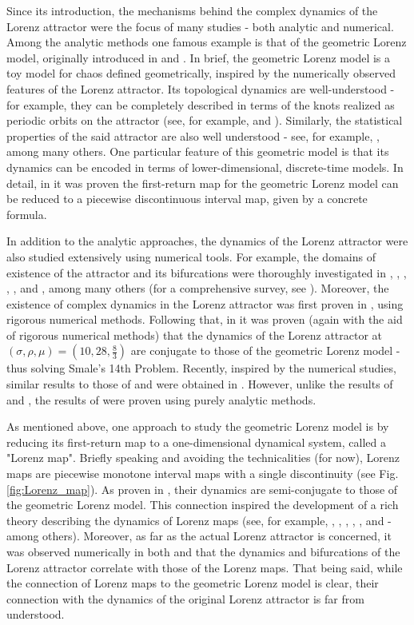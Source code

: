 \documentclass[10pt,reqno]{amsart}
\theoremstyle{plain}
\theoremstyle{assumption}
\theoremstyle{notation}
\theoremstyle{claim}
\theoremstyle{conj}
\theoremstyle{theorem}
\theoremstyle{proposition}
\theoremstyle{corollary}
\begin{document}
Since its introduction, the mechanisms behind the complex dynamics of the Lorenz attractor were the focus of many studies - both analytic and numerical. Among the analytic methods one famous example is that of the geometric Lorenz model, originally introduced in \cite{SAB} and \cite{guck}. In brief, the geometric Lorenz model is a toy model for chaos defined geometrically, inspired by the numerically observed features of the Lorenz attractor. Its topological dynamics are well-understood - for example, they can be completely described in terms of the knots realized as periodic orbits on the attractor (see, for example, \cite{BW} and \cite{Hol}). Similarly, the statistical properties of the said attractor are also well understood - see, for example, \cite{HM}, among many others. One particular feature of this geometric model is that its dynamics can be encoded in terms of lower-dimensional, discrete-time models. In detail, in \cite{Wil} it was proven the first-return map for the geometric Lorenz model can be reduced to a piecewise discontinuous interval map, given by a concrete formula.

In addition to the analytic approaches, the dynamics of the Lorenz attractor were also studied extensively using numerical tools. For example, the domains of existence of the attractor and its bifurcations were thoroughly investigated in \cite{SNS}, \cite{KOC}, \cite{KO1}, \cite{YY}, \cite{KY}, \cite{BS} and \cite{BSS}, among many others (for a comprehensive survey, see \cite{Sparbook}). Moreover, the existence of complex dynamics in the Lorenz attractor was first proven in \cite{MM}, using rigorous numerical methods. Following that, in \cite{TUC} it was proven (again with the aid of rigorous numerical methods) that the dynamics of the Lorenz attractor at $(\sigma,\rho,\mu)=(10,28,\frac{8}{3})$ are conjugate to those of the geometric Lorenz model - thus solving Smale's 14th Problem. Recently, inspired by the numerical studies, similar results to those of \cite{TUC} and \cite{MM} were obtained in \cite{Pi}. However, unlike the results of \cite{MM} and \cite{TUC}, the results of \cite{Pi} were proven using purely analytic methods.

As mentioned above, one approach to study the geometric Lorenz model is by reducing its first-return map to a one-dimensional dynamical system, called a "Lorenz map". Briefly speaking and avoiding the technicalities (for now), Lorenz maps are piecewise monotone interval maps with a single discontinuity (see Fig.\ref{fig:Lorenz_map}). As proven in \cite{Wil}, their dynamics are semi-conjugate to those of the geometric Lorenz model. This connection inspired the development of a rich theory describing the dynamics of Lorenz maps (see, for example, \cite{Glen}, \cite{HubSpar}, \cite{GlenHall}, \cite{GS}, \cite{Alseda}, \cite{Pierre} and \cite{Winckler} - among others). Moreover, as far as the actual Lorenz attractor is concerned, it was observed numerically in both \cite{BS} and \cite{MK} that the dynamics and bifurcations of the Lorenz attractor correlate with those of the Lorenz maps. That being said, while the connection of Lorenz maps to the geometric Lorenz model is clear, their connection with the dynamics of the original Lorenz attractor is far from understood.
\end{document}
